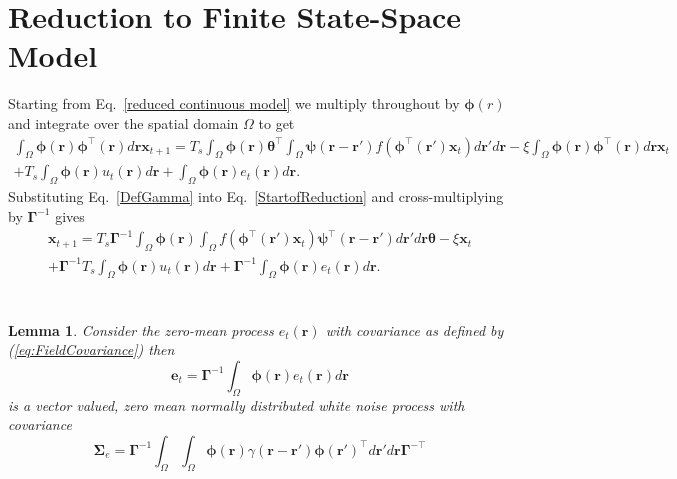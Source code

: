 \documentclass[12pt]{iopart}
\begin{document}
\section{Reduction to Finite State-Space Model}\label{Simplifying Decomposition} Starting from Eq.~\ref{reduced continuous model} we multiply throughout by $\boldsymbol{\phi}(r)$ and integrate over the spatial domain $\Omega$ to get 
\begin{eqnarray}
	\label{StartofReduction} \int_\Omega {\boldsymbol{\phi} \left(\mathbf{r}\right)\boldsymbol{\phi}^{\top}\left(\mathbf{r}\right) d\mathbf{r}} \mathbf{x}_{t+1} = T_s \int_\Omega {\boldsymbol{\phi} (\mathbf{r}) \boldsymbol{\theta}^{\top} \int_\Omega {\boldsymbol{\psi} \left(\mathbf{r}-\mathbf{r}'\right) f\left(\boldsymbol{\phi}^{\top}\left(\mathbf{r}'\right) \mathbf{x}_t \right)d\mathbf{r}'}d\mathbf{r}} - \xi\int_\Omega {\boldsymbol{\phi}(\mathbf{r})\boldsymbol{\phi}^{\top}(\mathbf{r})d\mathbf{r}} \mathbf{x}_t \\
	+ T_s \int_\Omega{\boldsymbol{\phi} \left(\mathbf{r}\right) u_t\left(\mathbf{r}\right)d\mathbf{r}} + \int_\Omega{\boldsymbol{\phi} \left(\mathbf{r}\right) e_t\left(\mathbf{r}\right)d\mathbf{r}}. 
\end{eqnarray}
Substituting Eq.~\ref{DefGamma} into Eq.~\ref{StartofReduction} and cross-multiplying by $\boldsymbol{\Gamma}^{-1}$ gives 
\begin{eqnarray}
	\label{Homogeneous SS Model} \mathbf{x}_{t+1} = T_s\boldsymbol{\Gamma}^{ - 1}\int_\Omega {\boldsymbol{\phi}\left(\mathbf{r}\right) \int_\Omega {f\left(\boldsymbol{\phi}^{\top}\left(\mathbf{r}'\right)\mathbf{x}_t\right) \boldsymbol{\psi}^{\top} \left(\mathbf{r}-\mathbf{r}'\right)d\mathbf{r}'} d\mathbf{r}} \boldsymbol{\theta} - \xi \mathbf{x}_t \\
	+ \boldsymbol{\Gamma}^{-1}T_s \int_\Omega{\boldsymbol{\phi} \left(\mathbf{r}\right) u_t\left(\mathbf{r}\right)d\mathbf{r}} + \boldsymbol{\Gamma}^{-1} \int_\Omega{\boldsymbol{\phi}\left(\mathbf{r}\right)e_t\left(\mathbf{r}\right)d\mathbf{r}}. 
\end{eqnarray}
\section{}\label{ColoredNoise} 
\newtheorem{lemma}{Lemma} 
\begin{lemma}
	Consider the zero-mean process $e_t\left(\mathbf r\right)$ with covariance as defined by (\ref{eq:FieldCovariance}) then 
	\begin{equation}
		\mathbf e_t=\boldsymbol{\Gamma}^{-1}\int_\Omega {\boldsymbol{\phi} ( \mathbf{r} )e_t( \mathbf{r} )d\mathbf{r}} \label{eq:AppendixWt} 
	\end{equation}
	is a vector valued, zero mean normally distributed white noise process with covariance 
	\begin{equation}
		\boldsymbol\Sigma_e =\mathbf{\Gamma}^{-1}\int_{\Omega}\int_{\Omega}\boldsymbol{\phi}\left(\mathbf r\right) \gamma\left(\mathbf r- \mathbf r' \right)\boldsymbol{\phi}\left(\mathbf r'\right)^{\top}d\mathbf r' d\mathbf r\mathbf{\Gamma}^{- \top} 
	\end{equation}
	\label{lemma:FieldCovariance} 
\end{lemma}
\end{document}
